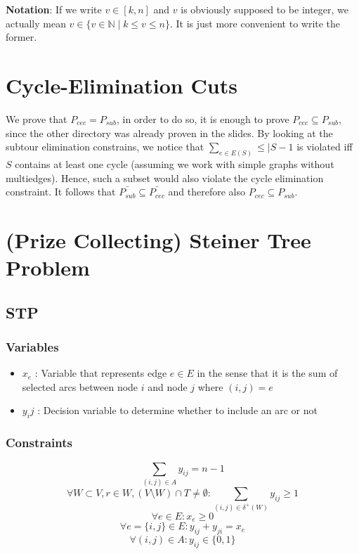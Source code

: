 \documentclass{article}
\begin{document}
\sloppy


\textbf{Notation}: If we write $ v \in [k,n] $ and $v$ is obviously supposed to be integer, we actually mean $v \in \{v \in \mathbb{N} \mid k \leq v \leq n\}$. It is just more convenient to write the former.

\section{Cycle-Elimination Cuts}

We prove that $P_{cec} = P_{sub}$, in order to do so, it is enough to prove $P_{cec} \subseteq P_{sub}$, since the other directory was already proven in the slides. By looking at the subtour elimination constrains, we notice that $\sum_{e \in E(S)} \leq \vert{S} - 1$ is violated iff $S$ contains at least one cycle (assuming we work with simple graphs without multiedges). Hence, such a subset would also violate the cycle elimination constraint. It follows that $\bar{P_{sub}} \subseteq \bar{P_{cec}}$ and therefore also $P_{cec} \subseteq P_{sub}$.

\clearpage

\section{(Prize Collecting) Steiner Tree Problem}

\subsection{STP}

\subsubsection{Variables}
\begin{itemize}
	\item $x_e$ : Variable that represents edge $e \in E$ in the sense that it is the sum of selected arcs between node $i$ and node $j$ where $(i,j) = e$ 
	\item $y_ij$ : Decision variable to determine whether to include an arc or not
\end{itemize}

\subsubsection{Constraints}
\[ \sum_{(i,j)\in A}y_{ij} = n-1 \]
\[ \forall W \subset V, r \in W, (V \setminus W) \cap T \neq \emptyset : \sum_{(i,j)\in \delta^+(W)}y_{ij} \geq 1 \]
\[ \forall e \in E : x_e \geq 0 \]
\[ \forall e = \{i,j\} \in E : y_{ij} + y_{ji} = x_e \]
\[ \forall (i,j) \in A : y_{ij} \in \{0,1\} \]
\end{document}
